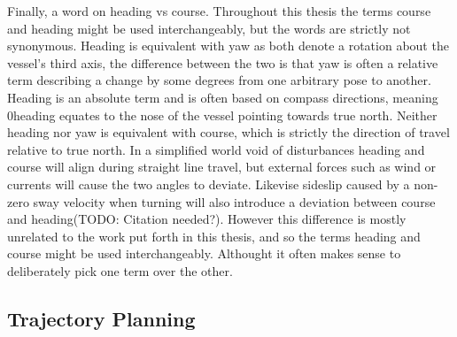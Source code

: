 Finally, a word on heading vs course. Throughout this thesis the terms course and heading might be used interchangeably, but the words are strictly not synonymous.
Heading is equivalent with yaw as both denote a rotation about the vessel's third axis, the difference between the two is that yaw is often a relative term describing
a change by some degrees from one arbitrary pose to another. Heading is an absolute term and is often based on compass directions, meaning 0\textdegree heading
equates to the nose of the vessel pointing towards true north. Neither heading nor yaw is equivalent with course, which is strictly the direction
of travel relative to true north. In a simplified world void of disturbances heading and course will align during straight line
travel, but external forces such as wind or currents will cause the two angles to deviate. Likevise sideslip caused by a non-zero sway velocity when turning will 
also introduce a deviation between course and heading(TODO: Citation needed?). However this difference is mostly unrelated to the work put forth in this thesis, 
and so the terms heading and course might be used interchangeably. Althought it often makes sense to deliberately pick one
term over the other.


\subsection{Trajectory Planning}

